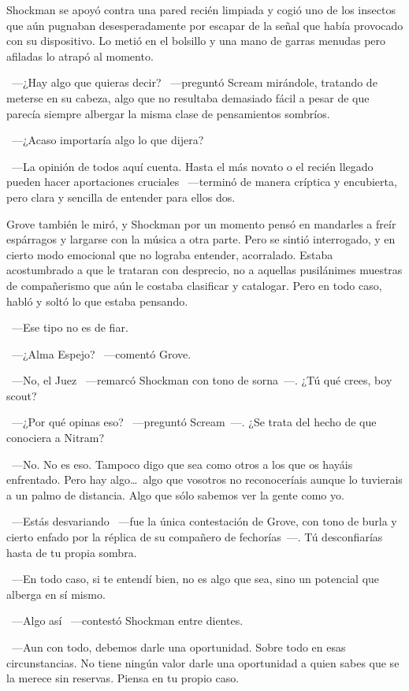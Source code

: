Shockman se apoyó contra una pared recién limpiada y cogió uno de los insectos que aún pugnaban desesperadamente por escapar de la señal que había provocado con su dispositivo. Lo metió en el bolsillo y una mano de garras menudas pero afiladas lo atrapó al momento.

~---¿Hay algo que quieras decir? ~---preguntó Scream mirándole, tratando de meterse en su cabeza, algo que no resultaba demasiado fácil a pesar de que parecía siempre albergar la misma clase de pensamientos sombríos.

~---¿Acaso importaría algo lo que dijera?

~---La opinión de todos aquí cuenta. Hasta el más novato o el recién llegado pueden hacer aportaciones cruciales ~---terminó de manera críptica y encubierta, pero clara y sencilla de entender para ellos dos.

Grove también le miró, y Shockman por un momento pensó en mandarles a freír espárragos y largarse con la música a otra parte. Pero se sintió interrogado, y en cierto modo emocional que no lograba entender, acorralado. Estaba acostumbrado a que le trataran con desprecio, no a aquellas pusilánimes muestras de compañerismo que aún le costaba clasificar y catalogar. Pero en todo caso, habló y soltó lo que estaba pensando.

~---Ese tipo no es de fiar.

~---¿Alma Espejo? ~---comentó Grove.

~---No, el Juez ~---remarcó Shockman con tono de sorna~---. ¿Tú qué crees, boy scout?

~---¿Por qué opinas eso? ~---preguntó Scream~---. ¿Se trata del hecho de que conociera a Nitram?

~---No. No es eso. Tampoco digo que sea como otros a los que os hayáis enfrentado. Pero hay algo\dots\ algo que vosotros no reconoceríais aunque lo tuvierais a un palmo de distancia. Algo que sólo sabemos ver la gente como yo.

~---Estás desvariando ~---fue la única contestación de Grove, con tono de burla y cierto enfado por la réplica de su compañero de fechorías~---. Tú desconfiarías hasta de tu propia sombra.

~---En todo caso, si te entendí bien, no es algo que sea, sino un potencial que alberga en sí mismo.

~---Algo así ~---contestó Shockman entre dientes.

~---Aun con todo, debemos darle una oportunidad. Sobre todo en esas circunstancias. No tiene ningún valor darle una oportunidad a quien sabes que se la merece sin reservas. Piensa en tu propio caso.

